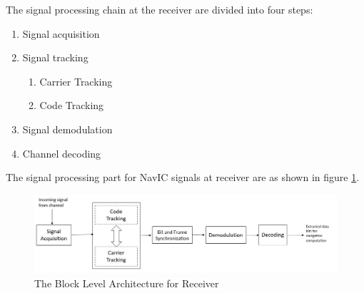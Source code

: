 
The signal processing chain at the receiver are divided into four steps:
\begin{enumerate}
	\item Signal acquisition
	\item Signal tracking
	\begin{enumerate}
		\item Carrier Tracking
		\item Code Tracking
	\end{enumerate}
	\item Signal demodulation
	\item Channel decoding
\end{enumerate}
The signal processing part for NavIC signals at receiver are as shown in figure \ref{fig:demod_flow}.
\begin{normalsize}
	\begin{figure}[ht]
		\centering
		\includegraphics[width=1\columnwidth]{figs/signal_aq_tr.jpg}
		\centering
		\captionsetup{justification=centering}
		\caption{The Block Level Architecture for Receiver}
		\label{fig:demod_flow}
	\end{figure}
\end{normalsize}
\\
\\
